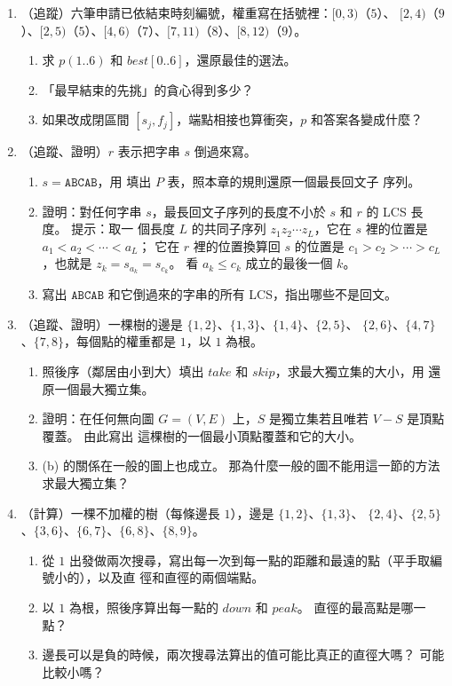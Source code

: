 \begin{enumerate}
\item \label{dp-q-wis}（追蹤）六筆申請已依結束時刻編號，權重寫在括號裡：$[0, 3)$（$5$）、
$[2, 4)$（$9$）、$[2, 5)$（$5$）、$[4, 6)$（$7$）、$[7, 11)$（$8$）、$[8, 12)$（$9$）。
\begin{enumerate}
\item 求 $p(1..6)$ 和 $\mathit{best}[0..6]$，還原最佳的選法。
\item 「最早結束的先挑」的貪心得到多少？
\item 如果改成閉區間 $[s_j, f_j]$，端點相接也算衝突，$p$ 和答案各變成什麼？
\end{enumerate}

\item \label{dp-q-lps}（追蹤、證明）$r$ 表示把字串 $s$ 倒過來寫。
\begin{enumerate}
\item $s = \texttt{ABCAB}$，用  填出 $P$ 表，照本章的規則還原一個最長回文子
序列。
\item 證明：對任何字串 $s$，最長回文子序列的長度不小於 $s$ 和 $r$ 的 LCS 長度。 提示：取一
個長度 $L$ 的共同子序列 $z_1 z_2 \cdots z_L$，它在 $s$ 裡的位置是 $a_1 < a_2 < \cdots < a_L$；
它在 $r$ 裡的位置換算回 $s$ 的位置是 $c_1 > c_2 > \cdots > c_L$，也就是
$z_k = s_{a_k} = s_{c_k}$。 看 $a_k \le c_k$ 成立的最後一個 $k$。
\item 寫出 $\texttt{ABCAB}$ 和它倒過來的字串的所有 LCS，指出哪些不是回文。
\end{enumerate}

\item \label{dp-q-tree-is}（追蹤、證明）一棵樹的邊是 $\{1,2\}$、$\{1,3\}$、$\{1,4\}$、$\{2,5\}$、
$\{2,6\}$、$\{4,7\}$、$\{7,8\}$，每個點的權重都是 $1$，以 $1$ 為根。
\begin{enumerate}
\item 照後序（鄰居由小到大）填出 $\mathit{take}$ 和 $\mathit{skip}$，求最大獨立集的大小，用
 還原一個最大獨立集。
\item 證明：在任何無向圖 $G = (V, E)$ 上，$S$ 是獨立集若且唯若 $V - S$ 是頂點覆蓋。 由此寫出
這棵樹的一個最小頂點覆蓋和它的大小。
\item (b) 的關係在一般的圖上也成立。 那為什麼一般的圖不能用這一節的方法求最大獨立集？
\end{enumerate}

\item \label{dp-q-diam}（計算）一棵不加權的樹（每條邊長 $1$），邊是 $\{1,2\}$、$\{1,3\}$、
$\{2,4\}$、$\{2,5\}$、$\{3,6\}$、$\{6,7\}$、$\{6,8\}$、$\{8,9\}$。
\begin{enumerate}
\item 從 $1$ 出發做兩次搜尋，寫出每一次到每一點的距離和最遠的點（平手取編號小的），以及直
徑和直徑的兩個端點。
\item 以 $1$ 為根，照後序算出每一點的 $\mathit{down}$ 和 $\mathit{peak}$。 直徑的最高點是哪一
點？
\item 邊長可以是負的時候，兩次搜尋法算出的值可能比真正的直徑大嗎？ 可能比較小嗎？
\end{enumerate}


\end{enumerate}

